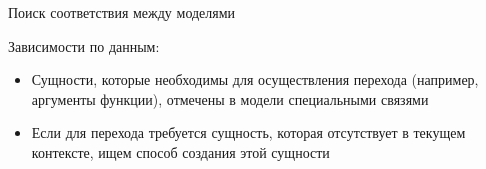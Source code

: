 \documentclass[12pt]{beamer}
\begin{document}
{
\begin{frame}[fragile]{Поиск соответствия между моделями}
  \begin{mybox}[]
  Зависимости по данным:
  \begin{itemize}
    \item Сущности, которые необходимы для осуществления перехода (например, аргументы функции), отмечены в модели специальными связями
  	\item Если для перехода требуется сущность, которая отсутствует в текущем контексте, ищем способ создания этой сущности
  \end{itemize}
  \end{mybox}
\end{frame}
}
\end{document}
